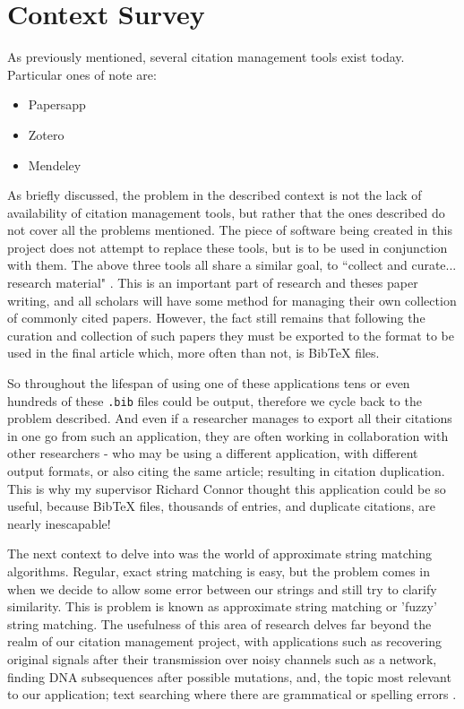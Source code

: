 \documentclass[a4paper,11pt]{article}
\newcommand{\code}[1]{\colorbox{codegray}{\texttt{#1}}}
\begin{document}
\section{Context Survey}
As previously mentioned, several citation management tools exist today. Particular ones of note are:
\begin{itemize}
    \item Papersapp \citep{papersapp}
    \item Zotero \citep{zotero}
    \item Mendeley \citep{mendeley}
\end{itemize}

As briefly discussed, the problem in the described context is not the lack of availability of citation management tools, but rather that the ones described do not cover all the problems mentioned. The piece of software being created in this project does not attempt to replace these tools, but is to be used in conjunction with them. The above three tools all share a similar goal, to ``collect and curate... research material" \citep{papersapp}. This is an important part of research and theses paper writing, and all scholars will have some method for managing their own collection of commonly cited papers. However, the fact still remains that following the curation and collection of such papers they must be exported to the format to be used in the final article which, more often than not, is BibTeX files.

So throughout the lifespan of using one of these applications tens or even hundreds of these \code{.bib} files could be output, therefore we cycle back to the problem described. And even if a researcher manages to export all their citations in one go from such an application, they are often working in collaboration with other researchers - who may be using a different application, with different output formats, or also citing the same article; resulting in citation duplication. This is why my supervisor Richard Connor thought this application could be so useful, because BibTeX files, thousands of entries, and duplicate citations, are nearly inescapable!


The next context to delve into was the world of approximate string matching algorithms. Regular, exact string matching is easy, but the problem comes in when we decide to allow some error between our strings and still try to clarify similarity. This is problem is known as approximate string matching or 'fuzzy' string matching. The usefulness of this area of research delves far beyond the realm of our citation management project, with applications such as recovering original signals after their transmission over noisy channels such as a network, finding DNA subsequences after possible mutations, and, the topic most relevant to our application; text searching where there are grammatical or spelling errors \citep{approximateStringMatching}.
\end{document}
